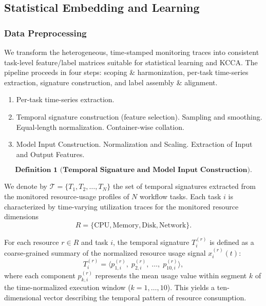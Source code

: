 \subsection{Statistical Embedding and Learning}
\label{sec:statistical_embedding_and_learning}
\subsubsection{Data Preprocessing}
\label{sec:data_preprocessing}
We transform the heterogeneous, time‐stamped monitoring traces into consistent task-level feature/label matrices suitable for statistical learning and KCCA. The pipeline proceeds in four steps: scoping & harmonization, per-task time-series extraction, signature construction, and label assembly & alignment.
\begin{enumerate}
    \item Per-task time-series extraction.
    \item Temporal signature construction (feature selection).
          \subitem Sampling and smoothing.
          \subitem Equal-length normalization.
          \subitem Container-wise collation.
    \item Model Input Construction.
          \subitem Normalization and Scaling.
          \subitem Extraction of Input and Output Features.
\end{enumerate}

\[
    \textbf{Definition 1 (Temporal Signature and Model Input Construction).}
\]

We denote by \( \mathcal{T} = \{ T_1, T_2, \dots, T_N \} \) the set of
temporal signatures extracted from the monitored resource-usage profiles
of \( N \) workflow tasks.
Each task \( i \) is characterized by time-varying utilization traces
for the monitored resource dimensions
\[
    R = \{ \text{CPU}, \text{Memory}, \text{Disk}, \text{Network} \}.
\]

\noindent
For each resource \( r \in R \) and task \( i \),
the temporal signature \( T_i^{(r)} \) is defined as a
coarse-grained summary of the normalized resource usage signal
\( x_i^{(r)}(t) \):
\[
    T_i^{(r)} =
    \bigl\langle
    p_{1,i}^{(r)},\;
    p_{2,i}^{(r)},\;
    \dots,\;
    p_{10,i}^{(r)}
    \bigr\rangle,
    \tag{1}
\]
where each component \( p_{k,i}^{(r)} \) represents the mean
usage value within segment \( k \) of the time-normalized
execution window (\( k = 1, \dots, 10 \)).
This yields a ten-dimensional vector describing the temporal pattern of
resource consumption.

